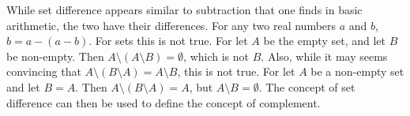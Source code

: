         While set difference appears similar to subtraction that one finds in
        basic arithmetic, the two have their differences. For any two real
        numbers $a$ and $b$, $b=a-(a-b)$. For sets this is not true. For let $A$
        be the empty set, and let $B$ be non-empty. Then
        $A\setminus(A\setminus{B})=\emptyset$, which is not $B$.
        Also, while it may seems convincing that
        $A\setminus(B\setminus{A})=A\setminus{B}$, this is not true. For
        let $A$ be a non-empty set and let $B=A$. Then
        $A\setminus(B\setminus{A})=A$, but $A\setminus{B}=\emptyset$.
        The concept of set difference can then be used to define the
        concept of complement.